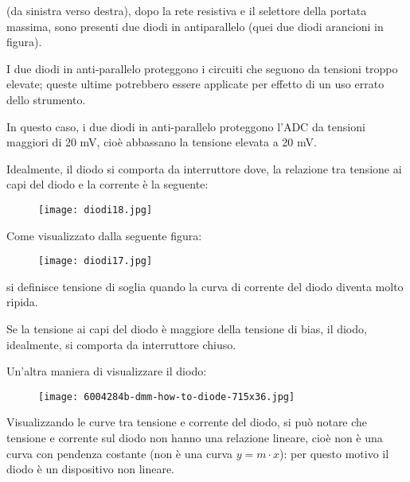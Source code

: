 (da sinistra verso destra), dopo la rete resistiva e il selettore della portata massima, sono presenti due diodi in antiparallelo (quei due diodi arancioni in figura). \newline 

I due diodi in anti-parallelo proteggono i circuiti che seguono da tensioni troppo elevate; queste ultime potrebbero essere applicate per effetto di un uso errato dello strumento. \newline 

In questo caso, i due diodi in anti-parallelo proteggono l'ADC da tensioni maggiori di 20 mV, cioè abbassano la tensione elevata a 20 mV. \newline 




\newpage 

Idealmente, il diodo si comporta da interruttore dove, la relazione tra tensione ai capi del diodo e la corrente è la seguente: 

\begin{figure}[h]
    \centering
    \texttt{[image: diodi18.jpg]}
\end{figure}

Come visualizzato dalla seguente figura: 

\begin{figure}[h]
    \centering
    \texttt{[image: diodi17.jpg]}
\end{figure}

si definisce tensione di soglia quando la curva di corrente del diodo diventa molto ripida. \newline 

Se la tensione ai capi del diodo è maggiore della tensione di bias, il diodo, idealmente, si comporta da interruttore chiuso. \newline 

Un'altra maniera di visualizzare il diodo: 

\begin{figure}[h]
    \centering
    \texttt{[image: 6004284b-dmm-how-to-diode-715x36.jpg]}
\end{figure}

Visualizzando le curve tra tensione e corrente del diodo, si può notare che tensione e corrente sul diodo non hanno una relazione lineare, 
cioè non è una curva con pendenza costante (non è una curva $y = m \cdot x$): per questo motivo il diodo è un dispositivo non lineare. \newline 

